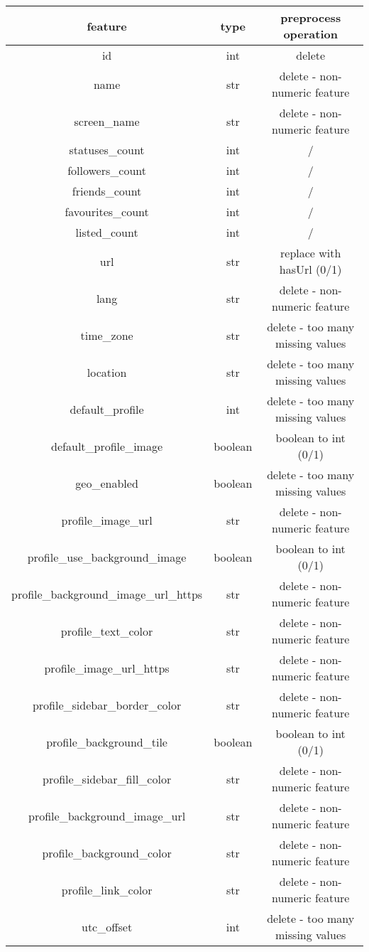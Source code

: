 \begin{center}
	\begin{tabular}{ccc}
		\\feature&type&preprocess operation\\
		\hline\hline
		id&int&delete\\
		name&str&delete - non-numeric feature\\
		screen\_name&str&delete - non-numeric feature\\
		statuses\_count&int&/\\
		followers\_count&int&/\\
		friends\_count&int&/\\
		favourites\_count&int&/\\
		listed\_count&int&/\\
		url&str&replace with hasUrl (0/1)\\
		lang&str&delete - non-numeric feature\\
		time\_zone&str&delete - too many missing values\\
		location&str&delete - too many missing values\\
		default\_profile&int&delete - too many missing values\\
		default\_profile\_image&boolean&boolean to int (0/1)\\
		geo\_enabled&boolean&delete - too many missing values\\
		profile\_image\_url&str&delete - non-numeric feature\\
		profile\_use\_background\_image&boolean&boolean to int (0/1)\\
		profile\_background\_image\_url\_https&str&delete - non-numeric feature\\
		profile\_text\_color&str&delete - non-numeric feature\\
		profile\_image\_url\_https&str&delete - non-numeric feature\\
		profile\_sidebar\_border\_color&str&delete - non-numeric feature\\
		profile\_background\_tile&boolean&boolean to int (0/1)\\
		profile\_sidebar\_fill\_color&str&delete - non-numeric feature\\
		profile\_background\_image\_url&str&delete - non-numeric feature\\
		profile\_background\_color&str&delete - non-numeric feature\\
		profile\_link\_color&str&delete - non-numeric feature\\
		utc\_offset&int&delete - too many missing values\\

\end{tabular}
\end{center}
